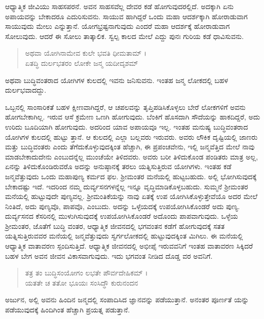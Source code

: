 ಆಧ್ಯಾತ್ಮಿಕ ಜೀವಿಯು ಸಾಹಸಪರನೆ. ಅವನ ಸಾಹಸವೆಲ್ಲ ದೇವರ ಕಡೆ ಹೋಗುವುದರಲ್ಲಿದೆ. ಅದಕ್ಕಾಗಿ ಏನು ಅಪಾಯವನ್ನು ಬೇಕಾದರೂ ಎದುರಿಸುವನು. ಸಾಯುವ ಹಾಗಿದ್ದರೆ ಒಂದು ಮಹಾ ಆದರ್ಶಕ್ಕಾಗಿ ಹೋರಾಡುವಾಗ ಸಾಯುವುದು ಮೇಲು ಎನ್ನುತ್ತಾನೆ. ಯೋಗಭ್ರಷ್ಟನಾಗುವುದು ಎಂದರೆ ಮಹಾ ಆದರ್ಶಕ್ಕೆ ಹೋರಾಡುವಾಗ ಸೋಲುವುದು. ಆದರೆ ಈ ಸೋಲು ತಾತ್ಕಾಲಿಕ. ಸ್ವಲ್ಪ ಕಾಲದ ಮೇಲೆ ಎದ್ದು ಪುನಃ ಗುರಿಯ ಕಡೆ ಧಾವಿಸುವನು.

\begin{verse}
ಅಥವಾ ಯೋಗಿನಾಮೇವ ಕುಲೇ ಭವತಿ ಧೀಮತಾಮ್ ।\\ಏತದ್ಧಿ ದುರ್ಲಭತರಂ ಲೋಕೇ ಜನ್ಮ ಯದೀದೃಶಮ್ 
\end{verse}

{\small ಅಥವಾ ಬುದ್ಧಿವಂತರಾದ ಯೋಗಿಗಳ ಕುಲದಲ್ಲಿ ಇವನು ಜನಿಸುವನು. ಇಂತಹ ಜನ್ಮ ಲೋಕದಲ್ಲಿ ಬಹಳ ದುರ್ಲಭವಾದದ್ದು.}

ಒಬ್ಬನಲ್ಲಿ ಸಾಂಸಾರಿಕತೆ ಬಹಳ ಕ್ಷೀಣವಾಗಿದ್ದರೆ, ಆ ಚಪಲವನ್ನು ತೃಪ್ತಿಪಡಿಸಿಕೊಳ್ಳಲು ಬೇರೆ ಲೋಕಗಳಿಗೆ ಅವನು ಹೋಗಬೇಕಾಗಿಲ್ಲ. ಇರುವ ಆಸೆ ಕ್ರಮೇಣ ಒಣಗಿ ಹೋಗುವುದು. ಬೆಂಕಿಗೆ ಹೊಸದಾಗಿ ಸೌದೆಯನ್ನು ಹಾಕದಿದ್ದರೆ, ಅದು ಉರಿದು ಬೂದಿಯಾಗಿ ಹೋಗುವುದು. ಅದರಿಂದ ಯಾವ ಅಪಾಯವೂ ಇಲ್ಲ. ಇಂತಹ ಮನುಷ್ಯ ಬುದ್ಧಿವಂತರಾದ ಯೋಗಿಗಳ ಕುಲದಲ್ಲಿ ಹುಟ್ಟು ತ್ತಾನೆ. ಆ ಕುಲದಲ್ಲಿ ಎಲ್ಲಾ ಬಲ್ಲವರು ಇರುವರು. ಅವರು ಲೌಕಿಕ ದೃಷ್ಟಿಯಲ್ಲಿ ಜಾಣರು ಮತ್ತು ಬುದ್ಧಿವಂತರು ಎಂದು ತೆಗೆದುಕೊಳ್ಳುವುದಕ್ಕಿಂತ ಹೆಚ್ಚಾಗಿ, ಈ ಪ್ರಪಂಚವೇನು, ಇಲ್ಲಿ ಜನ್ಮವೆತ್ತಿದ ಮೇಲೆ ನಾವು ಮಾಡಬೇಕಾದುದೇನು ಎಂಬುದನ್ನೆಲ್ಲ ಮುಂಚೆಯೇ ತಿಳಿದವರು. ಅವರು ಬರೀ ತಿಳಿದುಕೊಂಡ ಪಂಡಿತರು ಮಾತ್ರ ಅಲ್ಲ, ಏನನ್ನು ತಿಳಿದುಕೊಂಡಿರುವರೊ ಅದನ್ನು ಅನುಷ್ಠಾನಕ್ಕೆ ತರಲು ಯತ್ನಿಸುತ್ತಿರುವ ಯೋಗಿಗಳು. ಇಂತಹ ಕಡೆ ಜನ್ಮವೆತ್ತುವುದು ಒಂದು ಮಹಾಪುಣ್ಯ ಕರ್ಮದ ಫಲ. ಶ್ರೀಮಂತರ ಮನೆಯಲ್ಲಿ ಹುಟ್ಟಬಹುದು. ಅಲ್ಲಿ ಭೋಗಿಸುವುದಕ್ಕೆ ಬೇಕಾದಷ್ಟು ಇದೆ. ಇದರಿಂದ ನಮ್ಮ ದುರ್ವ್ಯಸನಗಳನ್ನೆಲ್ಲ ಇನ್ನೂ ವೃದ್ಧಿಮಾಡಿಕೊಳ್ಳಬಹುದು. ಸುಮ್ಮನೆ ಶ್ರೀಮಂತರ ಮನೆಯಲ್ಲಿ ಹುಟ್ಟುವುದೇ ಪುಣ್ಯವಲ್ಲ. ಶ್ರೀಮಂತಿಕೆಯನ್ನು ನಾವು ಏತಕ್ಕೆ ಉಪ ಯೋಗಿಸಿಕೊಳ್ಳುತ್ತೇವೆಯೊ ಅದರ ಮೇಲೆ ನಿಂತಿದೆ, ಅದು ಪುಣ್ಯವೊ, ಪಾಪವೊ, ಎಂಬುದು. ಅದನ್ನು ಒಳ್ಳೆಯದಕ್ಕೆ ಉಪಯೋಗಿಸಿಕೊಂಡರೆ ಅದು ಪುಣ್ಯ. ದುರ್ವ್ಯಸನದ ಕೆಸರಿನಲ್ಲಿ ಮುಳುಗಿಸುವುದಕ್ಕೆ ಉಪಯೋಗಿಸಿಕೊಂಡರೆ ಅದೊಂದು ಪಾಪವಾಗುವುದು. ಒಳ್ಳೆಯ ಶ್ರೀಮಂತರ, ಜೊತೆಗೆ ಬುದ್ಧಿ ವಂತರ, ಆಧ್ಯಾತ್ಮಿಕ ಜೀವನದಲ್ಲಿ ಭಗವಂತನ ಕಡೆಗೆ ಹೋಗುವುದಕ್ಕೆ ಸತತ ಯತ್ನಿಸುತ್ತಿರುವವರ ಮನೆಯಲ್ಲಿ ಜನ್ಮವೆತ್ತುವುದು ಸ್ವರ್ಗಲೋಕದಲ್ಲಿ ಹುಟ್ಟುವುದಕ್ಕಿಂತ ಮಿಗಿಲು. ಈ ಮನೆಯಲ್ಲಿ ಆಧ್ಯಾತ್ಮಿಕ ವಾತಾವರಣ ಸ್ಪಂದಿಸುತ್ತಿದೆ. ಆಧ್ಯಾತ್ಮಿಕ ಜೀವನದಲ್ಲಿ ಅಭೀಪ್ಸೆ ಇರುವವನಿಗೆ ಇಂತಹ ವಾತಾವರಣ ಸಿಕ್ಕಿದರೆ ಬಹಳ ಬೇಗ ಅವನ ಜೀವನ ವಿಕಾಸವಾಗುವುದು. ಇದು ಭಗವಂತ ನೀಡಿದ ದೊಡ್ಡ ವರ ಅವನಿಗೆ.

\begin{verse}
ತತ್ರ ತಂ ಬುದ್ಧಿಸಂಯೋಗಂ ಲಭತೇ ಪೌರ್ವದೇಹಿಕಮ್ ।\\ಯತತೇ ಚ ತತೋ ಭೂಯಃ ಸಂಸಿದ್ಧೌ ಕುರುನಂದನ 
\end{verse}

{\small ಅರ್ಜುನ, ಅಲ್ಲಿ ಅವನು ಹಿಂದಿನ ಜನ್ಮದಲ್ಲಿ ಸಂಪಾದಿಸಿದ ಜ್ಞಾನವನ್ನು ಪಡೆಯುತ್ತಾನೆ. ಅನಂತರ ಪೂರ್ಣತೆ ಯನ್ನು ಪಡೆಯುವುದಕ್ಕೆ ಹಿಂದಿಗಿಂತ ಹೆಚ್ಚಾಗಿ ಪ್ರಯತ್ನ ಪಡುತ್ತಾನೆ.}

